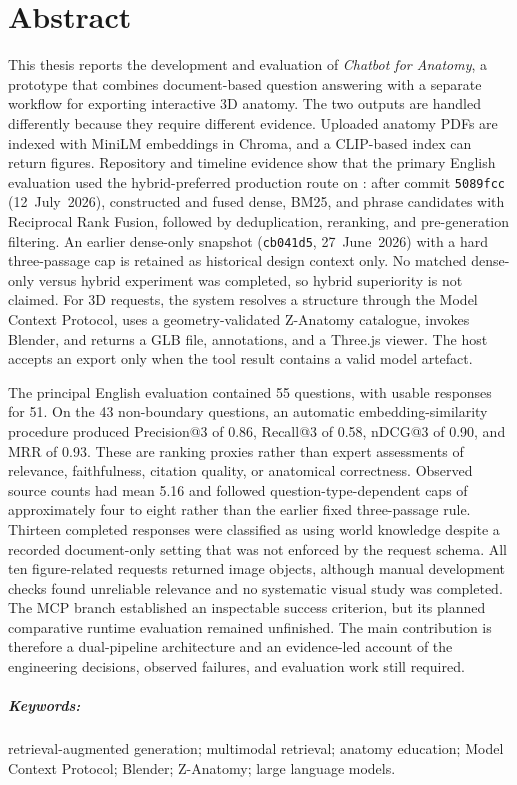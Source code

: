 \chapter*{Abstract}

This thesis reports the development and evaluation of \emph{Chatbot for Anatomy}, a prototype that combines document-based question answering with a separate workflow for exporting interactive 3D anatomy. The two outputs are handled differently because they require different evidence. Uploaded anatomy PDFs are indexed with MiniLM embeddings in Chroma, and a CLIP-based index can return figures. Repository and timeline evidence show that the primary English evaluation used the hybrid-preferred production route on : after commit \texttt{5089fcc} (12~July~2026),  constructed  and fused dense, BM25, and phrase candidates with Reciprocal Rank Fusion, followed by deduplication, reranking, and pre-generation filtering. An earlier dense-only snapshot (\texttt{cb041d5}, 27~June~2026) with a hard three-passage cap is retained as historical design context only. No matched dense-only versus hybrid experiment was completed, so hybrid superiority is not claimed. For 3D requests, the system resolves a structure through the Model Context Protocol, uses a geometry-validated Z-Anatomy catalogue, invokes Blender, and returns a GLB file, annotations, and a Three.js viewer. The host accepts an export only when the tool result contains a valid model artefact.

The principal English evaluation contained 55 questions, with usable responses for 51. On the 43 non-boundary questions, an automatic embedding-similarity procedure produced Precision@3 of 0.86, Recall@3 of 0.58, nDCG@3 of 0.90, and MRR of 0.93. These are ranking proxies rather than expert assessments of relevance, faithfulness, citation quality, or anatomical correctness. Observed source counts had mean 5.16 and followed question-type-dependent caps of approximately four to eight rather than the earlier fixed three-passage rule. Thirteen completed responses were classified as using world knowledge despite a recorded document-only setting that was not enforced by the request schema. All ten figure-related requests returned image objects, although manual development checks found unreliable relevance and no systematic visual study was completed. The MCP branch established an inspectable success criterion, but its planned comparative runtime evaluation remained unfinished. The main contribution is therefore a dual-pipeline architecture and an evidence-led account of the engineering decisions, observed failures, and evaluation work still required.

\paragraph{Keywords:}
retrieval-augmented generation;
multimodal retrieval;
anatomy education;
Model Context Protocol;
Blender;
Z-Anatomy;
large language models.

\cleardoublepage
